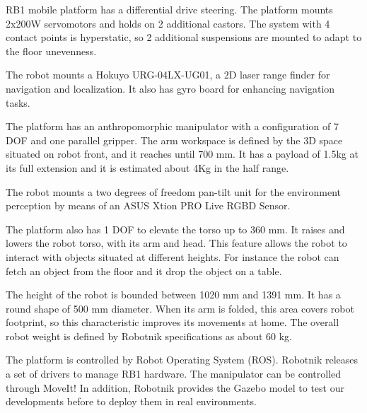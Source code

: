 \documentclass[conference]{IEEEtran}
\begin{document}
RB1 mobile platform  has a differential drive steering.  
The platform mounts 2x200W servomotors and holds on 2 additional castors. The system with 4 contact points is hyperstatic, so 2 additional suspensions are mounted to adapt to the floor unevenness. 

The robot mounts a Hokuyo URG-04LX-UG01, a 2D laser range finder for navigation and localization. 
It also has gyro board for enhancing navigation tasks. 


The platform has an anthropomorphic manipulator with a configuration of 7 DOF and one parallel gripper.
The arm workspace is defined by the 3D space situated on robot front, and it reaches until 700 mm. 
It has a payload of 1.5kg at its full extension and it is estimated about 4Kg in the half range. 

The robot mounts a two degrees of freedom pan-tilt unit for the environment perception by means of an ASUS Xtion PRO Live RGBD Sensor. 


The platform also has 1 DOF to elevate the torso up to 360 mm. It raises and lowers the robot torso, with its arm and head. This feature allows the robot to interact with objects situated at different heights. For instance the robot can fetch an object from the floor and it drop the object  on a table. 

The height of the robot is bounded between 1020 mm and 1391 mm.
It has a round shape of 500 mm diameter. When its arm is folded, this area covers robot footprint, so this characteristic improves its movements at home.  The overall robot weight is defined by Robotnik specifications as about  60 kg. 


The platform is controlled by Robot Operating System (ROS). Robotnik releases a set of drivers to manage RB1 hardware. The manipulator can be controlled through MoveIt! In addition, Robotnik provides the Gazebo model to test our developments before to deploy them in real environments.


\end{document}
